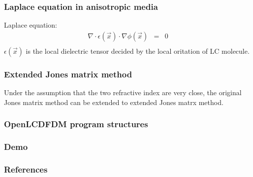\documentclass{beamer}
\begin{document}
\begin{frame}
\frametitle{Laplace equation in anisotropic media}
Laplace equation:
\begin{eqnarray}
\nabla \cdot \epsilon(\vec x) \cdot \nabla \phi(\vec x) &=& 0 \nonumber \\
\label{eq:laplace}
\end{eqnarray}
$\epsilon(\vec x)$ is the local dielectric tensor decided by the local oritation of LC molecule. 
\end{frame}
\begin{frame}
\frametitle{Extended Jones matrix method}
Under the assumption that the two refractive index are very close, the original Jones matrix method can be extended to extended Jones matrx method.
\end{frame}
\begin{frame}
\frametitle{OpenLCDFDM program structures}
\end{frame}
\begin{frame}
\frametitle{Demo}
\end{frame}
\begin{frame}
\frametitle{References}
\begin{thebibliography}{0}
\end{thebibliography}
\end{frame}

\end{document}

